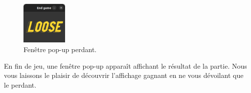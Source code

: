 \begin{figure}[htbp]
    \centering
    \includegraphics[width=0.2\textwidth]{loose.png}
    \caption{Fenêtre pop-up perdant.}
\end{figure}
En fin de jeu, une fenêtre pop-up apparaît affichant le résultat de la partie. Nous vous laissons le plaisir de découvrir l'affichage gagnant en ne vous dévoilant que le perdant.
